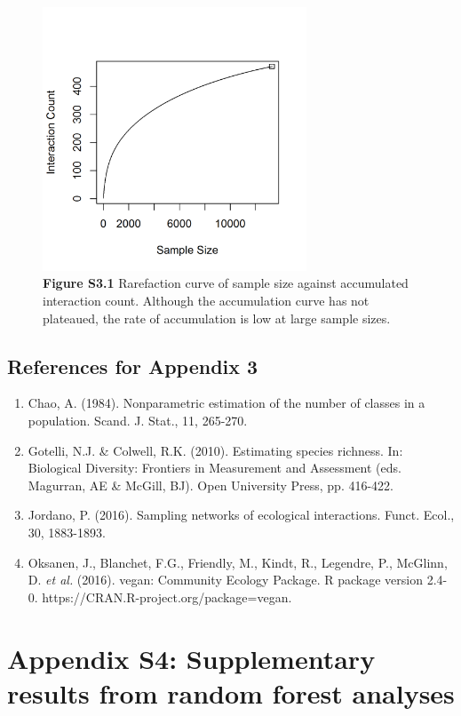 \documentclass[11pt]{article}
\begin{document}
\begin{figure}[H]
\centering\includegraphics[width=0.7\textwidth]{../Figures/Rarefaction.png} 
\caption[]{\textbf{Figure S3.1} Rarefaction curve of sample size against accumulated interaction count. Although the accumulation curve has not plateaued, the rate of accumulation is low at large sample sizes.  }
\end{figure}

\subsection*{References for Appendix 3}

\begin{enumerate}
\item Chao, A. (1984). Nonparametric estimation of the number of classes in a population. Scand. J. Stat., 11, 265-270.
\item Gotelli, N.J. \& Colwell, R.K. (2010). Estimating species richness. In: Biological Diversity: Frontiers in Measurement and Assessment (eds. Magurran, AE \& McGill, BJ). Open University Press, pp. 416-422.
\item Jordano, P. (2016). Sampling networks of ecological interactions. Funct. Ecol., 30, 1883-1893.
\item Oksanen, J., Blanchet, F.G., Friendly, M., Kindt, R., Legendre, P., McGlinn, D. \emph{et al. }(2016). vegan: Community Ecology Package. R package version 2.4-0.  https://CRAN.R-project.org/package=vegan. 
\end{enumerate}

\section{Appendix S4: Supplementary results from random forest analyses}
\end{document}
